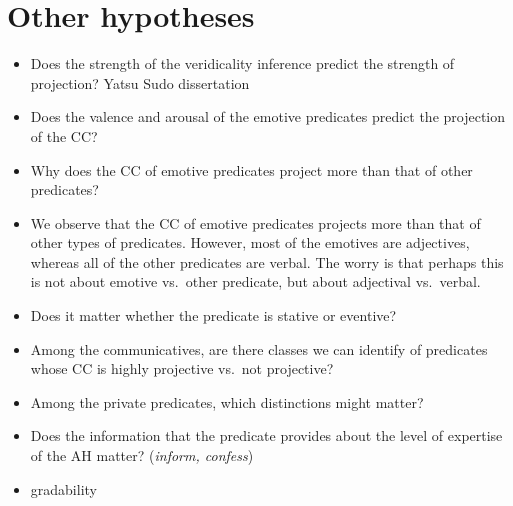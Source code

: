 \documentclass[11pt,fleqn]{article}
\newcommand{\6}{\mbox{$[\hspace*{-.6mm}[$}}
\newcommand{\9}{\mbox{$]\hspace*{-.6mm}]$}}
\begin{document}
\section{Other hypotheses}

\begin{itemize}

\item Does the strength of the veridicality inference predict the strength of projection? Yatsu Sudo dissertation

\item Does the valence and arousal of the emotive predicates predict the projection of the CC?

\item Why does the CC of emotive predicates project more than that of other predicates? 

\item We observe that the CC of emotive predicates projects more than that of other types of predicates. However, most of the emotives are adjectives, whereas all of the other predicates are verbal. The worry is that perhaps this is not about emotive vs.\ other predicate, but about adjectival vs.\ verbal. 

\item Does it matter whether the predicate is stative or eventive? 

\item Among the communicatives, are there classes we can identify of predicates whose CC is highly projective vs.\ not projective?

\item Among the private predicates, which distinctions might matter?

\item Does the information that the predicate provides about the level of expertise of the AH matter? ({\em inform, confess})

\item gradability

\end{itemize}




\end{document}
